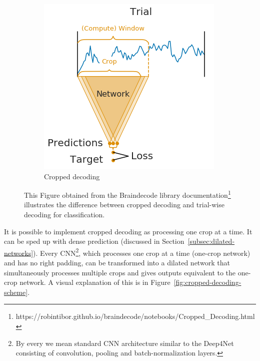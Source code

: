 \begin{figure}[!htbp]
\begin{subfigure}[b]{0.45\textwidth}
   \includegraphics[width=\linewidth]{img/ch3/trialwise-explanation2}
   \caption{Cropped decoding}
   \label{fig:trial-wise-decoding-cropped}
\end{subfigure}
\caption[Trial-wise vs. cropped decoding]{This Figure obtained from the Braindecode library documentation\footnote{https://robintibor.github.io/braindecode/notebooks/Cropped\_Decoding.html} illustrates the difference between cropped decoding and trial-wise decoding for classification.}
\label{fig:trial-wise-decoding} 
\end{figure}

It is possible to implement cropped decoding as processing one crop at a time.
It can be sped up with dense prediction (discussed in Section~\ref{subsec:dilated-networks}). 
Every CNN\footnote{By every we mean standard CNN architecture similar to the Deep4Net consisting of convolution, pooling and batch-normalization layers.}, which processes one crop at a time (one-crop network) and has no right padding, can be transformed into a dilated network that simultaneously processes multiple crops and gives outputs equivalent to the one-crop network. 
A visual explanation of this is in Figure~\ref{fig:cropped-decoding-scheme}.


